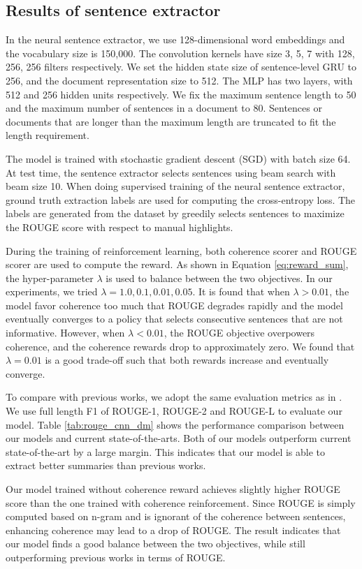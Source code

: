 \documentclass[letterpaper]{article} %
\begin{document}
	\subsection{Results of sentence extractor}
	In the neural sentence extractor, we use 128-dimensional word embeddings and the vocabulary size is 150,000. The convolution kernels have size 3, 5, 7 with 128, 256, 256 filters respectively. We set the hidden state size of sentence-level GRU to 256, and the document representation size to 512. The MLP has two layers, with 512 and 256 hidden units respectively. We fix the maximum sentence length to 50 and the maximum number of sentences in a document to 80. Sentences or documents that are longer than the maximum length are truncated to fit the length requirement.
	
	The model is trained with stochastic gradient descent (SGD) with batch size 64. At test time, the sentence extractor selects sentences using beam search with beam size 10. When doing supervised training of the neural sentence extractor, ground truth extraction labels are used for computing the cross-entropy loss. The labels are generated from the dataset by greedily selects sentences to maximize the ROUGE score with respect to manual highlights.
	
	During the training of reinforcement learning, both coherence scorer and ROUGE scorer are used to compute the reward. As shown in Equation \ref{eq:reward_sum}, the hyper-parameter $\lambda$ is used to balance between the two objectives. In our experiments, we tried $\lambda=1.0, 0.1, 0.01, 0.05$. It is found that when $\lambda > 0.01$, the model favor coherence too much that ROUGE degrades rapidly and the model eventually converges to a policy that selects consecutive sentences that are not informative. However, when $\lambda < 0.01$, the ROUGE objective overpowers coherence, and the coherence rewards drop to approximately zero. We found that $\lambda=0.01$ is a good trade-off such that both rewards increase and eventually converge.
	
	To compare with previous works, we adopt the same evaluation metrics as in \cite{SummaRuNNer}. We use full length F1 of ROUGE-1, ROUGE-2 and ROUGE-L to evaluate our model. Table \ref{tab:rouge_cnn_dm} shows the performance comparison between our models and current state-of-the-arts. Both of our models outperform current state-of-the-art by a large margin. This indicates that our model is able to extract better summaries than previous works. 
	
	Our model trained without coherence reward achieves slightly higher ROUGE score than the one trained with coherence reinforcement. Since ROUGE is simply computed based on n-gram and is ignorant of the coherence between sentences, enhancing coherence may lead to a drop of ROUGE. The result indicates that our model finds a good balance between the two objectives, while still outperforming previous works in terms of ROUGE.
	
\end{document}

